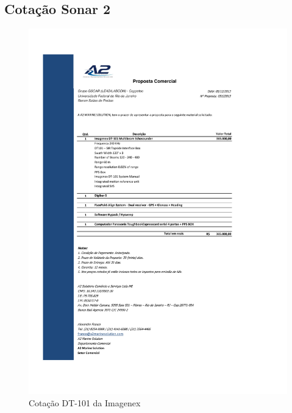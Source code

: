 \subsection{Cotação Sonar 2 }
\begin{figure}[H]
 \centering
 \includegraphics[width=0.9\columnwidth]{Seaking_profiler/price_quote_1.pdf}
 \caption{Cotação DT-101 da Imagenex}
\end{figure}

